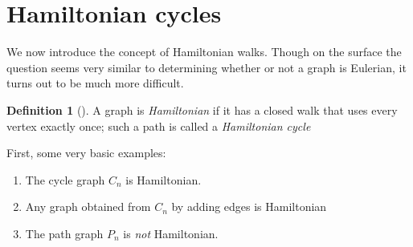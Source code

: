 \documentclass[10pt,]{book}
\theoremstyle{plain}
\theoremstyle{definition}
\newtheorem{definition}[theorem]{Definition}
\theoremstyle{definition}
\theoremstyle{definition}
\theoremstyle{definition}
\numberwithin{equation}{section}
\begin{document}
\section[{Hamiltonian cycles}]{Hamiltonian cycles}\label{s_walks_hamiltonian}
\hypertarget{p-134}{}%
We now introduce the concept of Hamiltonian walks. Though on the surface the question seems very similar to determining whether or not a graph is Eulerian, it turns out to be much more difficult.%
\begin{definition}[{}]\label{definition-17}
\hypertarget{p-135}{}%
A graph is \emph{Hamiltonian} if it has a closed walk that uses every vertex exactly once; such a path is called a \emph{Hamiltonian cycle}%
\end{definition}
\hypertarget{p-136}{}%
First, some very basic examples:%
\leavevmode%
\begin{enumerate}
\item\hypertarget{li-31}{}The cycle graph \(C_n\) is Hamiltonian.%
\item\hypertarget{li-32}{}Any graph obtained from \(C_n\) by adding edges is Hamiltonian%
\item\hypertarget{li-33}{}The path graph \(P_n\) is \emph{not} Hamiltonian.%
\end{enumerate}
\end{document}
